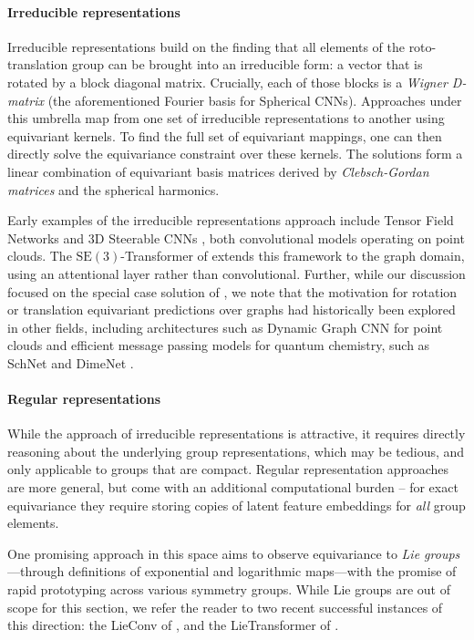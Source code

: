 \paragraph{Irreducible representations}
Irreducible representations build on the finding that all elements of the roto-translation group can be brought into an irreducible form: a vector that is rotated by a block diagonal matrix. Crucially, each of those blocks is a \emph{Wigner D-matrix} (the aforementioned Fourier basis for Spherical CNNs). Approaches under this umbrella map from one set of irreducible representations to another using equivariant kernels. To find the full set of equivariant mappings, one can then directly solve the equivariance constraint over these kernels. The solutions form a linear combination of equivariant basis matrices derived by {\em Clebsch-Gordan matrices} and the spherical harmonics.

Early examples of the irreducible representations approach include Tensor Field Networks \citep{thomas2018tensor} and 3D Steerable CNNs \citep{weiler20183d}, both convolutional models operating on point clouds. The $\mathrm{SE}(3)$-Transformer of \citet{fuchs2020se} extends this framework to the graph domain, using an attentional layer rather than convolutional. Further, while our discussion focused on the special case solution of \citet{satorras2021n}, we note that the motivation for rotation or translation equivariant predictions over graphs had historically been explored in other fields, including architectures such as Dynamic Graph CNN \citep{wang2019dynamic} for point clouds and efficient message passing models for quantum chemistry, such as SchNet \citep{schutt2018schnet} and DimeNet \citep{klicpera2020directional}.

\paragraph{Regular representations}
While the approach of irreducible representations is attractive, it requires directly reasoning about the underlying group representations, which may be tedious, and only applicable to groups that are compact. Regular representation approaches are more general, but come with an additional computational burden -- for exact equivariance they require storing copies of latent feature embeddings for \emph{all} group elements. 

One promising approach in this space aims to observe equivariance to \emph{Lie groups}---through definitions of exponential and logarithmic maps---with the promise of rapid prototyping across various symmetry groups. While Lie groups are out of scope for this section, we refer the reader to two recent successful instances of this direction: the LieConv of \citet{finzi2020generalizing}, and the LieTransformer of \citet{hutchinson2020lietransformer}.

